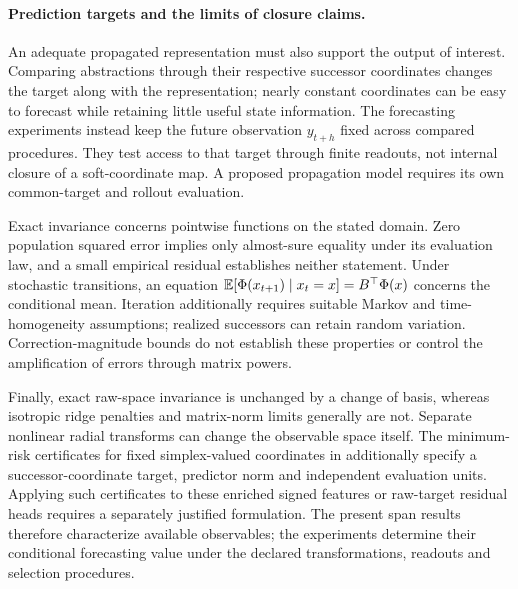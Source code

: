 \paragraph{Prediction targets and the limits of closure claims.}
An adequate propagated representation must also support the output of
interest. Comparing abstractions through their respective successor
coordinates changes the target along with the representation; nearly
constant coordinates can be easy to forecast while retaining little
useful state information. The forecasting experiments instead keep the
future observation $y_{t+h}$ fixed across compared procedures. They
test access to that target through finite readouts, not internal closure
of a soft-coordinate map. A proposed propagation model requires its own
common-target and rollout evaluation.

Exact invariance concerns pointwise functions on the stated domain.
Zero population squared error implies only almost-sure equality under
its evaluation law, and a small empirical residual establishes neither
statement. Under stochastic transitions, an equation
$\mathbb{E}[\Phi(x_{t+1})\mid x_t=x]=B^\top\Phi(x)$ concerns the conditional
mean. Iteration additionally requires suitable Markov and
time-homogeneity assumptions; realized successors can retain random
variation. Correction-magnitude bounds do not establish these
properties or control the amplification of errors through matrix powers.

Finally, exact raw-space invariance is unchanged by a change of basis,
whereas isotropic ridge penalties and matrix-norm limits generally are
not. Separate nonlinear radial transforms can change the observable
space itself. The minimum-risk certificates for fixed simplex-valued
coordinates in \citet{KumarKargaran2026Limits} additionally specify a
successor-coordinate target, predictor norm and independent evaluation
units. Applying such certificates to these enriched signed features or
raw-target residual heads requires a separately justified formulation.
The present span results therefore characterize available observables;
the experiments determine their conditional forecasting value under the
declared transformations, readouts and selection procedures.

